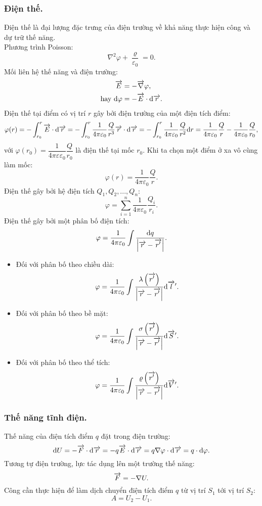 \begin{appendices}
\subsubsection{Điện thế.}
    Điện thế là đại lượng đặc trưng của điện trường về khả năng thực hiện công và dự trữ thế năng.\\
    Phương trình Poisson:
    $$\nabla^2 \varphi+ \dfrac{\varrho}{ \varepsilon_0}=0.$$
    Mối liên hệ thế năng và điện trường:
    \begin{align*}
    \overrightarrow{E}&=-\overrightarrow{\nabla}\varphi, \\
    \text{hay } \mathrm{d} \varphi&=-\overrightarrow{E}\cdot \mathrm{d} \overrightarrow{r}. 
    \end{align*}
    Điện thế tại điểm có vị trí $r$ gây bởi điện trường của một điện tích điểm:
    $$\varphi(r)=-\int_{r_0}^{r}\overrightarrow{E}\cdot \mathrm{d}\overrightarrow{r}= -\int_{r_0}^{r}\dfrac{1}{4\pi \varepsilon_0}\dfrac{Q}{r^3}\overrightarrow{r}\cdot  \mathrm{d}\overrightarrow{r}=-\int_{r_0}^{r}\dfrac{1}{4\pi \varepsilon_0}\dfrac{Q}{r^2}\mathrm{d} r=\dfrac{1}{4\pi \varepsilon_0}\dfrac{Q}{r}-\dfrac{1}{4\pi \varepsilon_0}\dfrac{Q}{r_0},$$
    với $\varphi(r_0)=\dfrac{1}{4\pi \varepsilon \varepsilon_0}\dfrac{Q}{r_0}$ là điện thế tại mốc $r_0$. Khi ta chọn một điểm ở xa vô cùng làm mốc:
    $$\varphi(r)=\dfrac{1}{4\pi \varepsilon_0}\dfrac{Q}{r}.$$
    Điện thế gây bởi hệ điện tích $Q_1,Q_2,...,Q_n$:
    $$\varphi=\sum_{i=1}^{n}\dfrac{1}{4\pi \varepsilon_0}\dfrac{Q_i}{r_i}.$$
    Điện thế gây bởi một phân bố điện tích:
    $$\varphi=\dfrac{1}{4\pi \varepsilon_0}\int \dfrac{\mathrm{d} q}{\left|\overrightarrow{r}-\overrightarrow{r'}\right|}.$$
    \begin{itemize}
        \item Đối với phân bố theo chiều dài:
    $$\varphi=\dfrac{1}{4\pi \varepsilon_0}\int \dfrac{\lambda\left(\overrightarrow{r'}\right)}{\left|\overrightarrow{r}-\overrightarrow{r'}\right|}\mathrm{d}\overrightarrow{l}'.$$
        \item Đối với phân bố theo bề mặt:
    $$\varphi=\dfrac{1}{4\pi \varepsilon_0}\int \dfrac{\sigma\left(\overrightarrow{r'}\right)}{\left|\overrightarrow{r}-\overrightarrow{r'}\right|}\mathrm{d}\overrightarrow{S}'.$$
        \item Đối với phân bố theo thể tích:
    $$\varphi=\dfrac{1}{4\pi \varepsilon_0}\int \dfrac{\varrho\left(\overrightarrow{r'}\right)}{\left|\overrightarrow{r}-\overrightarrow{r'}\right|}\mathrm{d}\overrightarrow{V}'.$$
    \end{itemize}
    
\subsubsection {Thế năng tĩnh điện.}
    Thế năng của điện tích điểm $q$ đặt trong điện trường:
    $$\mathrm{d} U=-\overrightarrow{F}\cdot \mathrm{d}\overrightarrow{r}=-q\overrightarrow{E}\cdot \mathrm{d}\overrightarrow{r}=q\nabla\varphi\cdot \mathrm{d}\overrightarrow{r}=q\cdot \mathrm{d}\varphi.$$
    Tương tự điện trường, lực tác dụng lên một trường thế năng:
    $$\overrightarrow{F}=-\nabla U.$$ 
    Công cần thực hiện để làm dịch chuyển điện tích điểm $q$ từ vị trí $S_1$ tới vị trí $S_2$:
    $$A=U_2-U_1.$$

\end{appendices}
